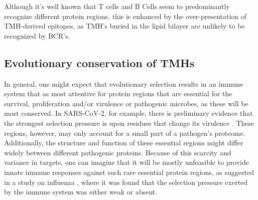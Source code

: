Although it's well known that T cells and B Cells seem to predominantly recognize different protein regions,
this is enhanced by the over-presentation of TMH-derived epitopes, as TMH's buried in the lipid bilayer are unlikely to be recognized by BCR's. 


\subsection{Evolutionary conservation of TMHs}

 
In general, one might expect that evolutionary selection results in
an immune system that as most attentive for protein regions that are
essential for the survival, proliferation and/or virulence or pathogenic microbes, 
as these will be most conserved.
In SARS-CoV-2, for example, there is preliminary evidence that the strongest
selection pressure is upon residues that change its 
virulence \cite{velazquez2020positive}.
These regions, however, may only account for a small part of a pathogen's proteome.
Additionally, the structure and function of these essential regions might differ widely between different pathogenic proteins.
Because of this scarcity and variance in targets, 
one can imagine that it will be mostly unfeasible 
to provide innate immune responses against such rare essential protein regions, 
as suggested in a study on influenza \cite{han2019individual},
where it was found that the selection pressure
exerted by the immune system was either weak or absent.
 

